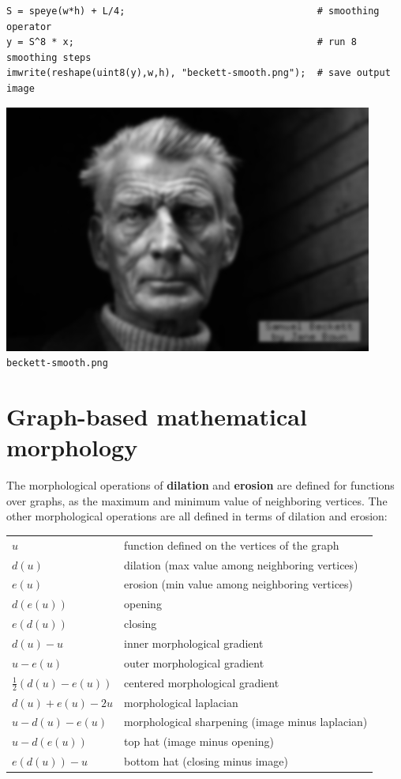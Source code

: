 \begin{verbatim}
S = speye(w*h) + L/4;                                  # smoothing operator
y = S^8 * x;                                           # run 8 smoothing steps
imwrite(reshape(uint8(y),w,h), "beckett-smooth.png");  # save output image
\end{verbatim}

\includegraphics{beckett-smooth.png}
{\small\verb+beckett-smooth.png+}

\section{Graph-based mathematical morphology}

The morphological operations of {\bf dilation} and {\bf erosion} are
defined for functions over graphs, as the maximum and minimum value of
neighboring vertices.  The other morphological operations are all defined in
terms of dilation and erosion:

\begin{tabular}{ll}
	$u$ & function defined on the vertices of the graph \\
	$d(u)$ & dilation (max value among neighboring vertices) \\
	$e(u)$ & erosion (min value among neighboring vertices) \\
	$d(e(u))$ & opening \\
	$e(d(u))$ & closing \\
	$d(u) - u$ & inner morphological gradient \\
	$u - e(u)$ & outer morphological gradient \\
	$\frac{1}{2}(d(u) - e(u))$ & centered morphological gradient \\
	$d(u) + e(u) - 2u$ & morphological laplacian \\
	$u - d(u) - e(u)$ & morphological sharpening (image minus laplacian) \\
	$u - d(e(u))$ & top hat (image minus opening) \\
	$e(d(u)) -u$ & bottom hat (closing minus image) \\
\end{tabular}

